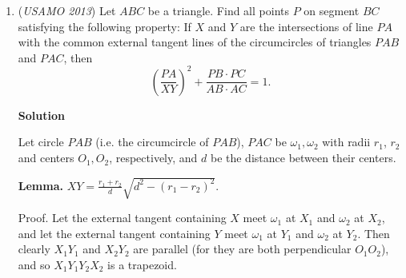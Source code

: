 \begin{enumerate}
 The point is that, for any positive integer $X$, most nonzero digits appear the same number of times in $X$ and $X+999\dots999$ if there are enough $9$s; In particular, if the units digits of $X$ is $1$, then all nonzero digits appear the same number of times as long as there are at least as many $9$s as digits in $X$.

 So we will pick $c$ to satisfy:

 
            \begin{itemize}
        \item $mc=nc+999\dots999$ where the number of $9$s is more than the number of digits of $nc$
        \item The units digit of $nc$ is $1$.
            \end{itemize}
            Because we made the units of $n$ to be $1$, the second condition is equivalent to making the units digit of $c$ to be $1$.

 The first condition is equivalent to $(m-n)c=999\dots999$. Because $m$ has at least one trailing 0, the units digit of $m-n$ is 9, so $\gcd(m-n,10)=1$ and there is some $c$ so that $(m-n)c=999\dots999$, and the units digit of $c$ must be $1$ which agrees with the other condition.

 Finally, as $m\gg n, (m-n)c\approx mc\gg nc$ so it is possible to make the number of $9$s more than the number of digits in $nc$.

 


 


	\item (\textit{USAMO 2013}) Let $ABC$ be a triangle.  Find all points $P$ on segment $BC$ satisfying the following property:  If $X$ and $Y$ are the intersections of line $PA$ with the common external tangent lines of the circumcircles of triangles $PAB$ and $PAC$, then 
 \[\left(\frac{PA}{XY}\right)^2+\frac{PB\cdot PC}{AB\cdot AC}=1.\]




\textbf{Solution}

Let circle $PAB$ (i.e. the circumcircle of $PAB$), $PAC$ be $\omega_1, \omega_2$ with radii $r_1$, $r_2$ and centers $O_1, O_2$, respectively, and $d$ be the distance between their centers.

 \textbf{Lemma.} $XY = \frac{r_1 + r_2}{d} \sqrt{d^2 - (r_1 - r_2)^2}.$

 Proof. Let the external tangent containing $X$ meet $\omega_1$ at $X_1$ and $\omega_2$ at $X_2$, and let the external tangent containing $Y$ meet $\omega_1$ at $Y_1$ and $\omega_2$ at $Y_2$. Then clearly $X_1 Y_1$ and $X_2 Y_2$ are parallel (for they are both perpendicular $O_1 O_2$), and so $X_1 Y_1 Y_2 X_2$ is a trapezoid.


\end{enumerate}
